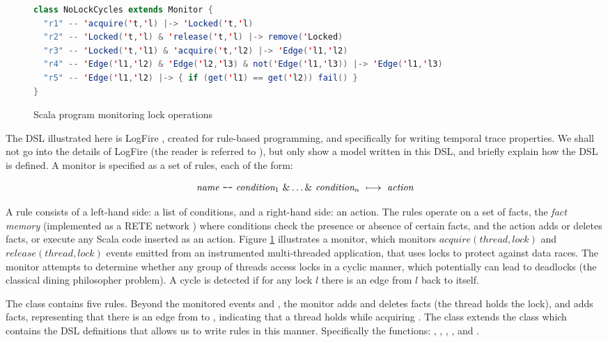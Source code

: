 \begin{figure}
\begin{lstlisting}[language=scala,frame=single]
class NoLockCycles extends Monitor {
  "r1" -- 'acquire('t,'l) |-> 'Locked('t,'l)
  "r2" -- 'Locked('t,'l) & 'release('t,'l) |-> remove('Locked)
  "r3" -- 'Locked('t,'l1) & 'acquire('t,'l2) |-> 'Edge('l1,'l2)
  "r4" -- 'Edge('l1,'l2) & 'Edge('l2,'l3) & not('Edge('l1,'l3)) |-> 'Edge('l1,'l3)
  "r5" -- 'Edge('l1,'l2) |-> { if (get('l1) == get('l2)) fail() }
}
\end{lstlisting}
\caption{Scala program monitoring lock operations}
\label{fig:deadlocks-scala}
\end{figure}

The DSL illustrated here is LogFire \cite{havelund-logfire-sttt14},
created for rule-based programming, and specifically for 
writing temporal trace properties. We shall not go into the details of LogFire (the reader is referred to \cite{havelund-logfire-sttt14}), but only show a model written in this DSL, 
and briefly explain how the DSL is defined. 
A monitor is specified as a set of rules, each of the form: 

\[
  \textit{name}\ \verb+--+\ \textit{condition}_1\ \& \ldots \&\ \textit{condition}_n\ \longmapsto\  \textit{action}
\]

\noindent
A rule consists of a left-hand side: a list of conditions, and a 
right-hand side:
an action. The rules operate on a set of facts, the 
{\em fact memory} (implemented as a RETE network \cite{forgy-rete-82}) 
where conditions check the presence or absence of certain facts, 
and the action adds or deletes 
facts, or execute any Scala code inserted as an action. Figure 
\ref{fig:deadlocks-scala} illustrates 
a monitor, which monitors $acquire(thread,lock)$ and 
$release(thread,lock)$ events emitted from an instrumented 
multi-threaded application, that uses locks to protect against
data races. The monitor attempts to determine whether any 
group of threads access locks
in a cyclic manner, which potentially can lead to deadlocks (the classical dining philosopher problem). 
A cycle is detected if for any lock $l$ there is 
an edge from $l$ back to itself.

The class contains five rules. Beyond the monitored events
 and , the monitor adds 
and deletes  facts (the thread holds
the lock), and adds  facts, representing
that there is an edge from  to , indicating that a thread holds   while acquiring
. The class extends the  class which contains the DSL definitions that allows us to write rules in this manner. Specifically the functions: \iscala{--}, \iscala{&}, \iscala{|->}, , and . 


